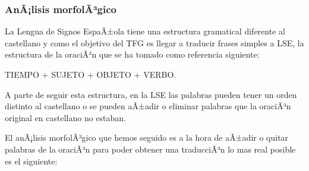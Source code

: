 \subsubsection{AnÃ¡lisis morfolÃ³gico} 

La Lengua de Signos EspaÃ±ola tiene una estructura gramatical diferente al castellano y como el objetivo del TFG es llegar a traducir frases simples a LSE, la estructura de la oraciÃ³n que se ha tomado como referencia siguiente:
\begin{center}
	TIEMPO + SUJETO + OBJETO + VERBO.
\end{center}

A parte de seguir esta estructura, en la LSE las palabras pueden tener un orden distinto al castellano o se pueden aÃ±adir o eliminar palabras que la oraciÃ³n original en castellano no estaban.

El anÃ¡lisis morfolÃ³gico que hemos seguido es a la hora de aÃ±adir o quitar palabras de la oraciÃ³n para poder obtener una traducciÃ³n lo mas real posible es el siguiente:

